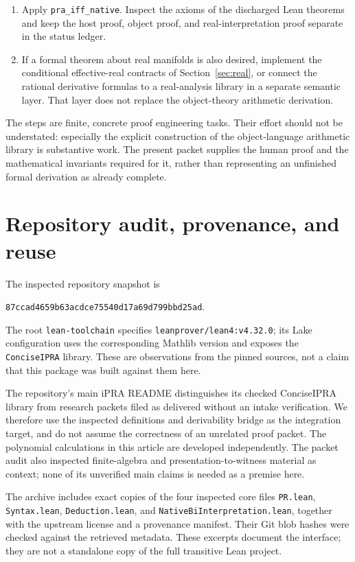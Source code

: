 \documentclass[11pt,a4paper]{article}
\numberwithin{equation}{section}
\theoremstyle{definition}\newtheorem{definition}[theorem]{Definition}
\theoremstyle{remark}\newtheorem{remark}[theorem]{Remark}
\newcommand{\file}[1]{\nolinkurl{#1}}
\begin{document}
\begin{enumerate}
 \item Apply \texttt{pra\_iff\_native}. Inspect the axioms of the discharged Lean theorems and keep the host proof, object proof, and real-interpretation proof separate in the status ledger.
 \item If a formal theorem about real manifolds is also desired, implement the conditional effective-real contracts of Section~\ref{sec:real}, or connect the rational derivative formulas to a real-analysis library in a separate semantic layer. That layer does not replace the object-theory arithmetic derivation.
\end{enumerate}

The steps are finite, concrete proof engineering tasks. Their effort should not be understated: especially the explicit construction of the object-language arithmetic library is substantive work. The present packet supplies the human proof and the mathematical invariants required for it, rather than representing an unfinished formal derivation as already complete.

\section{Repository audit, provenance, and reuse}\label{sec:repo}

The inspected repository snapshot is
\begin{center}\small
\texttt{87ccad4659b63acdce75540d17a69d799bbd25ad}.
\end{center}
The root \file{lean-toolchain} specifies \texttt{leanprover/lean4:v4.32.0}; its Lake configuration uses the corresponding Mathlib version and exposes the \texttt{ConciseIPRA} library. These are observations from the pinned sources, not a claim that this package was built against them here.

The repository's main iPRA README distinguishes its checked ConciseIPRA library from research packets filed as delivered without an intake verification. We therefore use the inspected definitions and derivability bridge as the integration target, and do not assume the correctness of an unrelated proof packet. The polynomial calculations in this article are developed independently. The packet audit also inspected finite-algebra and presentation-to-witness material as context; none of its unverified main claims is needed as a premise here.

The archive includes exact copies of the four inspected core files \file{PR.lean}, \file{Syntax.lean}, \file{Deduction.lean}, and \file{NativeBiInterpretation.lean}, together with the upstream license and a provenance manifest. Their Git blob hashes were checked against the retrieved metadata. These excerpts document the interface; they are not a standalone copy of the full transitive Lean project.
\end{document}
